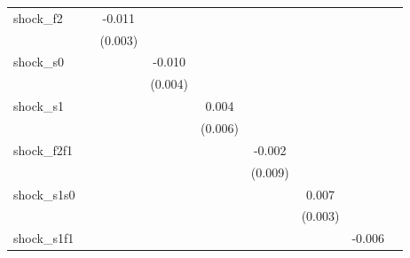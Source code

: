 {\begin{tabular}{l*{8}{c}}
\addlinespace
shock\_f2    &                     &      -0.011\sym{***}&                     &                     &                     &                     &                     &                     \\
            &                     &     (0.003)         &                     &                     &                     &                     &                     &                     \\
\addlinespace
shock\_s0    &                     &                     &      -0.010\sym{**} &                     &                     &                     &                     &                     \\
            &                     &                     &     (0.004)         &                     &                     &                     &                     &                     \\
\addlinespace
shock\_s1    &                     &                     &                     &       0.004         &                     &                     &                     &                     \\
            &                     &                     &                     &     (0.006)         &                     &                     &                     &                     \\
\addlinespace
shock\_f2f1  &                     &                     &                     &                     &      -0.002         &                     &                     &                     \\
            &                     &                     &                     &                     &     (0.009)         &                     &                     &                     \\
\addlinespace
shock\_s1s0  &                     &                     &                     &                     &                     &       0.007\sym{**} &                     &                     \\
            &                     &                     &                     &                     &                     &     (0.003)         &                     &                     \\
\addlinespace
shock\_s1f1  &                     &                     &                     &                     &                     &                     &      -0.006         &                     \\

\end{tabular}}
